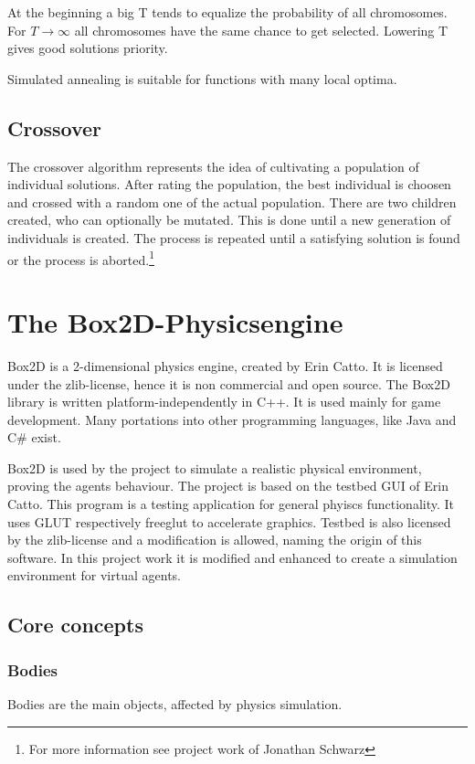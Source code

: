 \documentclass[10pt,a4paper,DIV=11]{scrreprt}
\begin{document}
At the beginning a big T tends to equalize the probability of all chromosomes. For $T \to \infty$ all chromosomes have the same chance to get selected. Lowering T gives good solutions priority.

Simulated annealing is suitable for functions with many local optima.

\section{Crossover}
The crossover algorithm represents the idea of cultivating a population of individual solutions. After rating the population, the best individual is choosen and crossed with a random one of the actual population. There are two children created, who can optionally be mutated. This is done until a new generation of individuals is created.
The process is repeated until a satisfying solution is found or the process is aborted.\footnote{For more information see project work of Jonathan Schwarz}



\chapter{The Box2D-Physicsengine}
Box2D is a 2-dimensional physics engine, created by Erin Catto\cite{box}. It is licensed under the zlib-license, hence it is non commercial and open source. The Box2D library is written platform-independently in C++. It is used mainly for game development. Many portations into other programming languages, like Java and C\# exist.

Box2D is used by the project to simulate a realistic physical environment, proving the agents behaviour. The project is based on the testbed GUI of Erin Catto. This program is a testing application for general phyiscs functionality. It uses GLUT respectively freeglut to accelerate graphics. Testbed is also licensed by the zlib-license and a modification is allowed, naming the origin of this software. In this project work it is modified and enhanced to create a simulation environment for virtual agents.


\section{Core concepts}

\subsection{Bodies}
Bodies are the main objects, affected by physics simulation.
\end{document}
